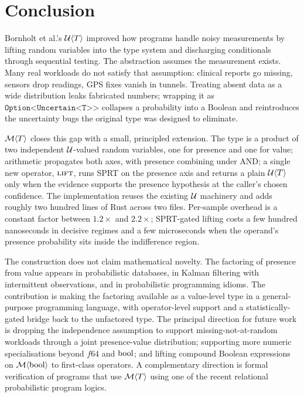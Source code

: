 \section{Conclusion}
\label{sec:conclusion}

Bornholt et al.'s $\mathcal{U}\langle T \rangle$ improved how programs handle
noisy measurements by lifting random variables into the type system and
discharging conditionals through sequential testing. The abstraction
assumes the measurement exists. Many real workloads do not satisfy that
assumption: clinical reports go missing, sensors drop readings, GPS fixes
vanish in tunnels. Treating absent data as a wide distribution leaks
fabricated numbers; wrapping it as $\texttt{Option<Uncertain<T>>}$
collapses a probability into a Boolean and reintroduces the uncertainty
bugs the original type was designed to eliminate.

$\mathcal{M}\langle T \rangle$ closes this gap with a small, principled
extension. The type is a product of two independent
$\mathcal{U}$-valued random variables, one for presence and one for value;
arithmetic propagates both axes, with presence combining under AND; a
single new operator, $\textsc{lift}$, runs SPRT on the presence axis and
returns a plain $\mathcal{U}\langle T \rangle$ only when the evidence
supports the presence hypothesis at the caller's chosen confidence. The
implementation reuses the existing $\mathcal{U}$ machinery and adds roughly
two hundred lines of Rust across two files. Per-sample overhead is a
constant factor between $1.2\times$ and $2.2\times$; SPRT-gated lifting
costs a few hundred nanoseconds in decisive regimes and a few
microseconds when the operand's presence probability sits inside the
indifference region.

The construction does not claim mathematical novelty. The factoring of
presence from value appears in probabilistic databases, in Kalman
filtering with intermittent observations, and in probabilistic
programming idioms. The contribution is making the factoring available
as a value-level type in a general-purpose programming language, with
operator-level support and a statistically-gated bridge back to the
unfactored type. The principal direction for future work is dropping the
independence assumption to support missing-not-at-random workloads
through a joint presence-value distribution; supporting more numeric
specialisations beyond $f64$ and $\mathrm{bool}$; and lifting compound Boolean
expressions on $\mathcal{M}\langle \mathrm{bool} \rangle$ to first-class operators.
A complementary direction is formal verification of programs that use
$\mathcal{M}\langle T \rangle$ using one of the recent relational
probabilistic program logics.

\newpage